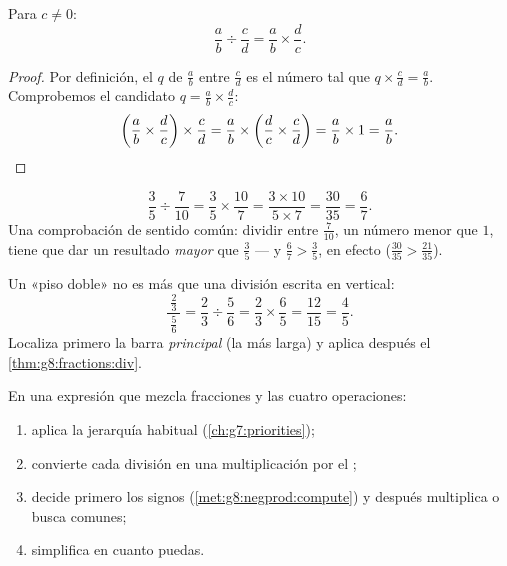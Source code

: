\begin{theorem}\label{thm:g8:fractions:div}
Para $c \neq 0$:
\[
\frac{a}{b} \div \frac{c}{d} = \frac{a}{b} \times \frac{d}{c} .
\]
\end{theorem}

\begin{proof}
Por definición, el  $q$ de $\frac ab$ entre $\frac cd$ es el
número tal que $q \times \frac cd = \frac ab$. Comprobemos el candidato
$q = \frac ab \times \frac dc$:
\[
\left(\frac ab \times \frac dc\right) \times \frac cd
= \frac ab \times \left(\frac dc \times \frac cd\right)
= \frac ab \times 1 = \frac ab . \qedhere
\]
\end{proof}

\begin{example}\label{ex:g8:fractions:div}
\[
\frac{3}{5} \div \frac{7}{10}
= \frac{3}{5} \times \frac{10}{7}
= \frac{3 \times 10}{5 \times 7}
= \frac{30}{35} = \frac{6}{7}.
\]
Una comprobación de sentido común: dividir entre $\frac{7}{10}$, un número menor que
$1$, tiene que dar un resultado \emph{mayor} que $\frac35$ --- y
$\frac67 > \frac35$, en efecto ($\frac{30}{35} > \frac{21}{35}$).
\end{example}

\begin{example}\label{ex:g8:fractions:complex}
Un «piso doble» no es más que una división escrita en vertical:
\[
\frac{\ \frac{2}{3}\ }{\ \frac{5}{6}\ }
= \frac{2}{3} \div \frac{5}{6}
= \frac{2}{3} \times \frac{6}{5}
= \frac{12}{15} = \frac{4}{5}.
\]
Localiza primero la barra \emph{principal} (la más larga) y aplica después el
\cref{thm:g8:fractions:div}.
\end{example}

\begin{method}\label{met:g8:fractions:mixed}
En una expresión que mezcla fracciones y las cuatro operaciones:
\begin{enumerate}
  \item aplica la jerarquía habitual (\cref{ch:g7:priorities});
  \item convierte cada división en una multiplicación por el ;
  \item decide primero los signos (\cref{met:g8:negprod:compute}) y después
        multiplica o busca  comunes;
  \item simplifica en cuanto puedas.
\end{enumerate}
\end{method}

